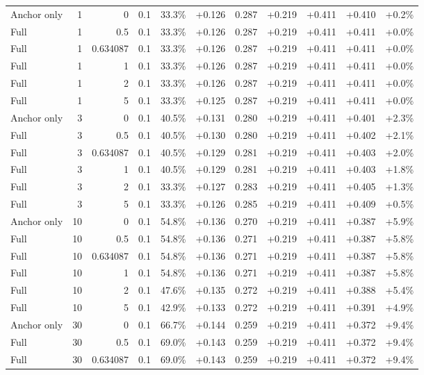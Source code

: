 \begin{table}[htbp]
\begin{tabular}{lrrrccccccc}
Anchor only & 1 & 0 & 0.1 & 33.3\% & +0.126 & 0.287 & +0.219 & +0.411 & +0.410 & +0.2\% \\
Full & 1 & 0.5 & 0.1 & 33.3\% & +0.126 & 0.287 & +0.219 & +0.411 & +0.411 & +0.0\% \\
Full & 1 & 0.634087 & 0.1 & 33.3\% & +0.126 & 0.287 & +0.219 & +0.411 & +0.411 & +0.0\% \\
Full & 1 & 1 & 0.1 & 33.3\% & +0.126 & 0.287 & +0.219 & +0.411 & +0.411 & +0.0\% \\
Full & 1 & 2 & 0.1 & 33.3\% & +0.126 & 0.287 & +0.219 & +0.411 & +0.411 & +0.0\% \\
Full & 1 & 5 & 0.1 & 33.3\% & +0.125 & 0.287 & +0.219 & +0.411 & +0.411 & +0.0\% \\
Anchor only & 3 & 0 & 0.1 & 40.5\% & +0.131 & 0.280 & +0.219 & +0.411 & +0.401 & +2.3\% \\
Full & 3 & 0.5 & 0.1 & 40.5\% & +0.130 & 0.280 & +0.219 & +0.411 & +0.402 & +2.1\% \\
Full & 3 & 0.634087 & 0.1 & 40.5\% & +0.129 & 0.281 & +0.219 & +0.411 & +0.403 & +2.0\% \\
Full & 3 & 1 & 0.1 & 40.5\% & +0.129 & 0.281 & +0.219 & +0.411 & +0.403 & +1.8\% \\
Full & 3 & 2 & 0.1 & 33.3\% & +0.127 & 0.283 & +0.219 & +0.411 & +0.405 & +1.3\% \\
Full & 3 & 5 & 0.1 & 33.3\% & +0.126 & 0.285 & +0.219 & +0.411 & +0.409 & +0.5\% \\
Anchor only & 10 & 0 & 0.1 & 54.8\% & +0.136 & 0.270 & +0.219 & +0.411 & +0.387 & +5.9\% \\
Full & 10 & 0.5 & 0.1 & 54.8\% & +0.136 & 0.271 & +0.219 & +0.411 & +0.387 & +5.8\% \\
Full & 10 & 0.634087 & 0.1 & 54.8\% & +0.136 & 0.271 & +0.219 & +0.411 & +0.387 & +5.8\% \\
Full & 10 & 1 & 0.1 & 54.8\% & +0.136 & 0.271 & +0.219 & +0.411 & +0.387 & +5.8\% \\
Full & 10 & 2 & 0.1 & 47.6\% & +0.135 & 0.272 & +0.219 & +0.411 & +0.388 & +5.4\% \\
Full & 10 & 5 & 0.1 & 42.9\% & +0.133 & 0.272 & +0.219 & +0.411 & +0.391 & +4.9\% \\
Anchor only & 30 & 0 & 0.1 & 66.7\% & +0.144 & 0.259 & +0.219 & +0.411 & +0.372 & +9.4\% \\
Full & 30 & 0.5 & 0.1 & 69.0\% & +0.143 & 0.259 & +0.219 & +0.411 & +0.372 & +9.4\% \\
Full & 30 & 0.634087 & 0.1 & 69.0\% & +0.143 & 0.259 & +0.219 & +0.411 & +0.372 & +9.4\% \\

\end{tabular}
\end{table}
